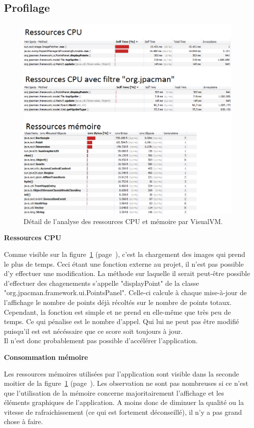\documentclass[12pt,a4paper,final]{article}
\newcommand{\smalltitle}[1]{\bigskip\large\textbf{#1}\par\normalsize\medskip}
\newcommand{\labelfigure}[1]{figure~\ref{#1} (page~\pageref{#1})}
\begin{document}
\subsection{Profilage}
\begin{figure}[!h]
	\centering
	\includegraphics[width=\textwidth]{Profilage.png}
	\caption{\label{profilage}Détail de l'analyse des ressources CPU et mémoire par VisualVM.}
\end{figure}
\smalltitle{Ressources CPU}
Comme visible sur la \labelfigure{profilage}, c'est la chargement des images qui prend le plus de temps. Ceci étant une fonction externe au projet, il n'est pas possible d'y effectuer une modification. La méthode sur laquelle il serait peut-être possible d'effectuer des chagenements s'appelle "displayPoint" de la classe "org.jpacman.framework.ui.PointsPanel". Celle-ci calcule à chaque mise-à-jour de l'affichage le nombre de points déjà récoltés sur le nombre de points totaux. Cependant, la fonction est simple et ne prend en elle-même que très peu de temps. Ce qui pénalise est le nombre d'appel. Qui lui ne peut pas être modifié puisqu'il est est nécéssaire que ce score soit toujours à jour. \\
Il n'est donc probablement pas possible d'accélérer l'application.

\smalltitle{Consommation mémoire}
Les ressources mémoires utilisées par l'application sont visible dans la seconde moitier de la \labelfigure{profilage}. Les observation ne sont pas nombreuses si ce n'est que l'utilisation de la mémoire concerne majoritairement l'affichage et les éléments graphiques de l'application. A moins donc de diminuer la qualité ou la vitesse de rafraichissement (ce qui est fortement déconseillé), il n'y a pas grand chose à faire.
\end{document}
